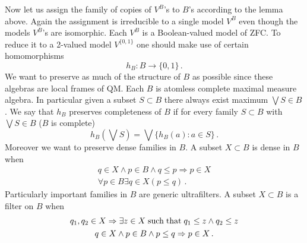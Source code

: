 \documentclass[12pt]{article}
\begin{document}
Now let us assign the family of copies of $V^B$'s to $B$'s according to the lemma above. Again the assignment is irreducible to a single model $V^B$ even though the models $V^B$'s are isomorphic. Each $V^B$ is a Boolean-valued model of ZFC. To reduce it to a 2-valued model $V^{\{0,1\}}$ one should make use of certain homomorphisms \[h_B:B\to \{0,1\}\,. \] 
We want to preserve as much of the structure of $B$ as possible since these algebras are local frames of QM. Each $B$ is atomless complete maximal measure algebra. In particular given a subset $S\subset B$ there always exist maximum $\bigvee S\in B$. We say that $h_B$ preserves completeness of $B$ if for every family $S\subset B$ with $\bigvee S \in B$ ($B$ is complete)
\[h_B(\bigvee S)=\bigvee \{h_B(a):a\in S\}\,. \]
Moreover we want to preserve dense families in $B$. A subset $X\subset B$ is dense in $B$ when 
\begin{gather}
q\in X \wedge p\in B \wedge q\leq p \Rightarrow p\in X\\
\forall p\in B \exists q\in X (p\leq q)\,.    
\end{gather}
Particularly important families in $B$ are generic ultrafilters. A subset $X\subset B$ is a filter on $B$ when
\begin{gather}
  q_1, q_2\in X \Rightarrow \exists z\in X \; {\rm such\; that}\; q_1\leq z \wedge q_2 \leq z \\
 q\in X \wedge p\in B \wedge p\leq q \Rightarrow p\in X\,. 
\end{gather}
\end{document}
